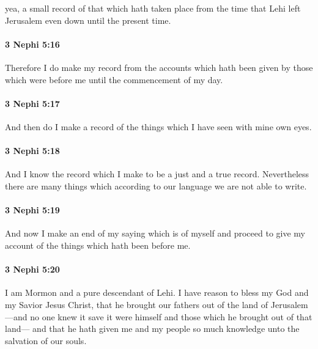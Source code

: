			yea, a small record of that which hath taken place
			from the time that Lehi left Jerusalem even down until the present time.

		\paragraph{3 Nephi 5:16} %
			\label{3NEPHI-5-16}

			Therefore I do make my record from the accounts
			which hath been given by those which were before me
			until the commencement of my day.

		\paragraph{3 Nephi 5:17} %
			\label{3NEPHI-5-17}

			And then do I make a record of the things
			which I have seen with mine own eyes.

		\paragraph{3 Nephi 5:18} %
			\label{3NEPHI-5-18}

			And I know the record which I make to be a just and a true record.
			Nevertheless there are many things
			which according to our language we are not able to write.

		\paragraph{3 Nephi 5:19} %
			\label{3NEPHI-5-19}

			And now I make an end of my saying which is of myself
			and proceed to give my account of the things which hath been before me.

		\paragraph{3 Nephi 5:20} %
			\label{3NEPHI-5-20}

			I am Mormon and a pure descendant of Lehi.
			I have reason to bless my God and my Savior Jesus Christ,
			that he brought our fathers out of the land of Jerusalem
			---and no one knew it save it were himself
			and those which he brought out of that land---
			and that he hath given me and my people
			so much knowledge unto the salvation of our souls.


